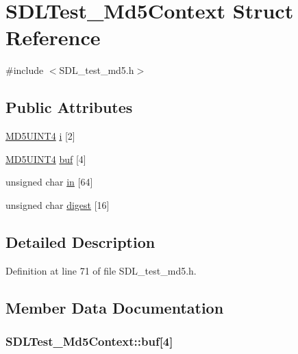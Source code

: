 \hypertarget{struct_s_d_l_test___md5_context}{\section{S\-D\-L\-Test\-\_\-\-Md5\-Context Struct Reference}
\label{struct_s_d_l_test___md5_context}
}


{\ttfamily \#include $<$S\-D\-L\-\_\-test\-\_\-md5.\-h$>$}

\subsection*{Public Attributes}
\begin{DoxyCompactItemize}
\item 
\hyperlink{_s_d_l__test__md5_8h_a2bdcfd1b3373be8191c70eb4a7cb84c6}{M\-D5\-U\-I\-N\-T4} \hyperlink{struct_s_d_l_test___md5_context_a95b3d5fd74fd1b7a27bf96f3bb32beb4}{i} \mbox{[}2\mbox{]}
\item 
\hyperlink{_s_d_l__test__md5_8h_a2bdcfd1b3373be8191c70eb4a7cb84c6}{M\-D5\-U\-I\-N\-T4} \hyperlink{struct_s_d_l_test___md5_context_a061f0cead7ec49ac4c5baf0bbd9c13a7}{buf} \mbox{[}4\mbox{]}
\item 
unsigned char \hyperlink{struct_s_d_l_test___md5_context_a337638ef799dc0ad9397ea9b175ea388}{in} \mbox{[}64\mbox{]}
\item 
unsigned char \hyperlink{struct_s_d_l_test___md5_context_ab29079997a9f35e5d52c2aac3ad28f90}{digest} \mbox{[}16\mbox{]}
\end{DoxyCompactItemize}


\subsection{Detailed Description}


Definition at line 71 of file S\-D\-L\-\_\-test\-\_\-md5.\-h.



\subsection{Member Data Documentation}
\hypertarget{struct_s_d_l_test___md5_context_a061f0cead7ec49ac4c5baf0bbd9c13a7}{
\subsubsection[{buf}]{ S\-D\-L\-Test\-\_\-\-Md5\-Context\-::buf\mbox{[}4\mbox{]}}}\label{struct_s_d_l_test___md5_context_a061f0cead7ec49ac4c5baf0bbd9c13a7}


